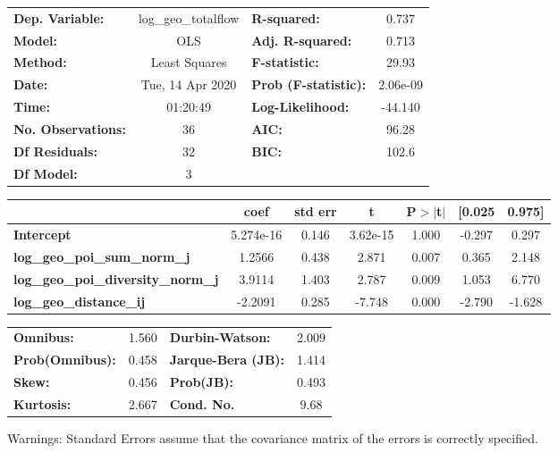 \begin{center}
\begin{tabular}{lclc}
\toprule
\textbf{Dep. Variable:}                    & log\_geo\_totalflow & \textbf{  R-squared:         } &     0.737   \\
\textbf{Model:}                            &         OLS         & \textbf{  Adj. R-squared:    } &     0.713   \\
\textbf{Method:}                           &    Least Squares    & \textbf{  F-statistic:       } &     29.93   \\
\textbf{Date:}                             &   Tue, 14 Apr 2020  & \textbf{  Prob (F-statistic):} &  2.06e-09   \\
\textbf{Time:}                             &       01:20:49      & \textbf{  Log-Likelihood:    } &   -44.140   \\
\textbf{No. Observations:}                 &            36       & \textbf{  AIC:               } &     96.28   \\
\textbf{Df Residuals:}                     &            32       & \textbf{  BIC:               } &     102.6   \\
\textbf{Df Model:}                         &             3       & \textbf{                     } &             \\
\bottomrule
\end{tabular}
\begin{tabular}{lcccccc}
                                           & \textbf{coef} & \textbf{std err} & \textbf{t} & \textbf{P$> |$t$|$} & \textbf{[0.025} & \textbf{0.975]}  \\
\midrule
\textbf{Intercept}                         &    5.274e-16  &        0.146     &  3.62e-15  &         1.000        &       -0.297    &        0.297     \\
\textbf{log\_geo\_poi\_sum\_norm\_j}       &       1.2566  &        0.438     &     2.871  &         0.007        &        0.365    &        2.148     \\
\textbf{log\_geo\_poi\_diversity\_norm\_j} &       3.9114  &        1.403     &     2.787  &         0.009        &        1.053    &        6.770     \\
\textbf{log\_geo\_distance\_ij}            &      -2.2091  &        0.285     &    -7.748  &         0.000        &       -2.790    &       -1.628     \\
\bottomrule
\end{tabular}
\begin{tabular}{lclc}
\textbf{Omnibus:}       &  1.560 & \textbf{  Durbin-Watson:     } &    2.009  \\
\textbf{Prob(Omnibus):} &  0.458 & \textbf{  Jarque-Bera (JB):  } &    1.414  \\
\textbf{Skew:}          &  0.456 & \textbf{  Prob(JB):          } &    0.493  \\
\textbf{Kurtosis:}      &  2.667 & \textbf{  Cond. No.          } &     9.68  \\
\bottomrule
\end{tabular}
\end{center}

Warnings: \newline
 [1] Standard Errors assume that the covariance matrix of the errors is correctly specified.